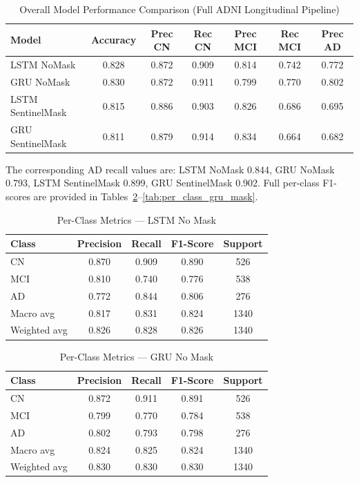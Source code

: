 \documentclass[12pt,singleside,a4paper]{article}
\begin{document}
\begin{table}[h]
\centering
\caption{Overall Model Performance Comparison (Full ADNI Longitudinal Pipeline)}
\begin{tabular}{lcccccc}
\toprule
\textbf{Model} & \textbf{Accuracy} & \textbf{Prec CN} & \textbf{Rec CN} & \textbf{Prec MCI} & \textbf{Rec MCI} & \textbf{Prec AD} \\
\midrule
LSTM NoMask     & 0.828 & 0.872 & 0.909 & 0.814 & 0.742 & 0.772 \\
GRU NoMask      & 0.830 & 0.872 & 0.911 & 0.799 & 0.770 & 0.802 \\
LSTM SentinelMask & 0.815 & 0.886 & 0.903 & 0.826 & 0.686 & 0.695 \\
GRU SentinelMask  & 0.811 & 0.879 & 0.914 & 0.834 & 0.664 & 0.682 \\
\bottomrule
\end{tabular}
\label{tab:model_comparison}
\end{table}

The corresponding AD recall values are: LSTM NoMask 0.844, GRU NoMask 0.793, LSTM SentinelMask 0.899, GRU SentinelMask 0.902. Full per-class F1-scores are provided in Tables~\ref{tab:per_class_lstm_nomask}--\ref{tab:per_class_gru_mask}.

\begin{table}[h]
\centering
\caption{Per-Class Metrics --- LSTM No Mask}
\begin{tabular}{lcccc}
\toprule
\textbf{Class} & \textbf{Precision} & \textbf{Recall} & \textbf{F1-Score} & \textbf{Support} \\
\midrule
CN  & 0.870 & 0.909 & 0.890 & 526 \\
MCI & 0.810 & 0.740 & 0.776 & 538 \\
AD  & 0.772 & 0.844 & 0.806 & 276 \\
\midrule
Macro avg    & 0.817 & 0.831 & 0.824 & 1340 \\
Weighted avg & 0.826 & 0.828 & 0.826 & 1340 \\
\bottomrule
\end{tabular}
\label{tab:per_class_lstm_nomask}
\end{table}

\begin{table}[h]
\centering
\caption{Per-Class Metrics --- GRU No Mask}
\begin{tabular}{lcccc}
\toprule
\textbf{Class} & \textbf{Precision} & \textbf{Recall} & \textbf{F1-Score} & \textbf{Support} \\
\midrule
CN  & 0.872 & 0.911 & 0.891 & 526 \\
MCI & 0.799 & 0.770 & 0.784 & 538 \\
AD  & 0.802 & 0.793 & 0.798 & 276 \\
\midrule
Macro avg    & 0.824 & 0.825 & 0.824 & 1340 \\
Weighted avg & 0.830 & 0.830 & 0.830 & 1340 \\
\bottomrule
\end{tabular}
\label{tab:per_class_gru_nomask}
\end{table}
\end{document}
